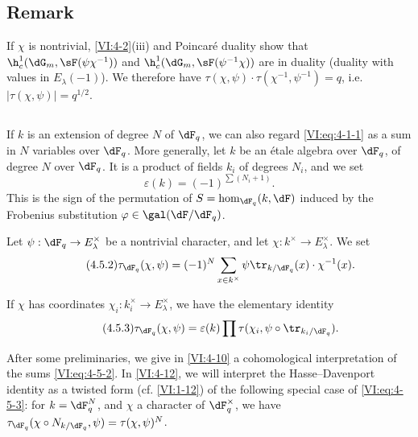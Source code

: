 \documentclass[oneside]{book}
\begin{document}
\subsection{Remark}\label{VI:4-4}

If $\chi$ is nontrivial, \ref{VI:4-2}(iii) and Poincaré duality 
show that $\h_c^1(\dG_m,\sF(\psi\chi^{-1}))$ and 
$\h_c^1(\dG_m,\sF(\psi^{-1}\chi))$ are in duality (duality with values 
in $E_\lambda(-1)$). We therefore have 
$\tau(\chi,\psi)\cdot \tau(\chi^{-1},\psi^{-1}) = q$, i.e. 
$|\tau(\chi,\psi)|=q^{1/2}$. 





\subsection{}\label{VI:4-5}

If $k$ is an extension of degree $N$ of $\dF_q$, we can also regard 
\eqref{VI:eq:4-1-1} as a sum in $N$ variables over $\dF_q$. More 
generally, let $k$ be an étale algebra over $\dF_q$, of degree $N$ over 
$\dF_q$. It is a product of fields $k_i$ of degrees $N_i$, and we set 
\begin{equation*}\tag{4.5.1}\label{VI:eq:4-5-1}
  \varepsilon(k) = (-1)^{\sum (N_i+1)} \text{.} 
\end{equation*}
This is the sign of the permutation of $S=\hom_{\dF_q}(k,\dF)$ induced by the 
Frobenius substitution $\varphi\in \gal(\dF/\dF_q)$. 

Let $\psi:\dF_q\to E_\lambda^\times$ be a nontrivial character, and let 
$\chi:k^\times \to E_\lambda^\times$. We set 
\begin{equation*}\tag{4.5.2}\label{VI:eq:4-5-2}
  \tau_{\dF_q}(\chi,\psi) = (-1)^N \sum_{x\in k^\times} \psi \tr_{k/\dF_q}(x) \cdot \chi^{-1}(x) \text{.} 
\end{equation*}

If $\chi$ has coordinates $\chi_i:k_i^\times \to E_\lambda^\times$, we 
have the elementary identity 
\begin{equation*}\tag{4.5.3}\label{VI:eq:4-5-3}
  \tau_{\dF_q}(\chi,\psi) = \varepsilon(k) \prod \tau(\chi_i,\psi\circ \tr_{k_i/\dF_q}) \text{.}
\end{equation*}

After some preliminaries, we give in \ref{VI:4-10} a 
cohomological interpretation of the sums \eqref{VI:eq:4-5-2}. In 
\ref{VI:4-12}, we will interpret the Hasse--Davenport identity as a 
twisted form (cf. \ref{VI:1-12}) of the following special case of 
\eqref{VI:eq:4-5-3}: for $k=\dF_q^N$, and $\chi$ a character of 
$\dF_q^\times$, we have 
$\tau_{\dF_q}(\chi\circ N_{k/\dF_q},\psi)=\tau(\chi,\psi)^N$. 
\end{document}
